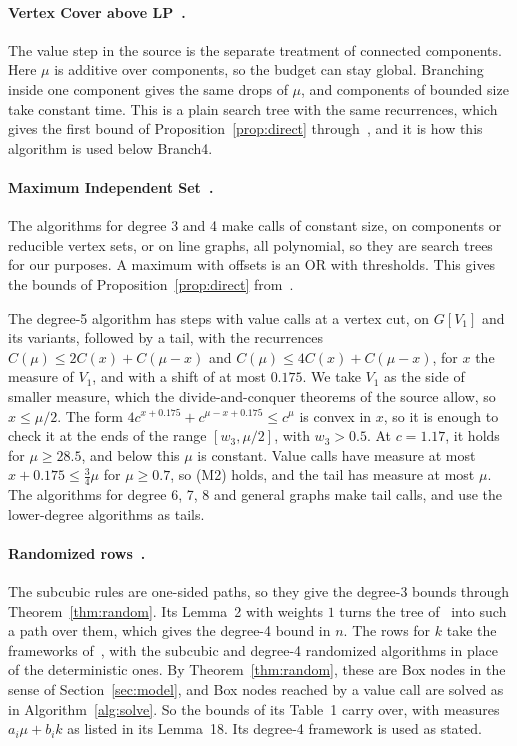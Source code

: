 \documentclass[11pt]{article}
\theoremstyle{definition}
\theoremstyle{remark}
\begin{document}
\paragraph{Vertex Cover above LP~\cite{LNRRS14}.} The value step in the source is the separate treatment of connected components. Here $\mu$ is additive over components, so the budget can stay global. Branching inside one component gives the same drops of $\mu$, and components of bounded size take constant time. This is a plain search tree with the same recurrences, which gives the first bound of Proposition~\ref{prop:direct} through~\cite{Mon18}, and it is how this algorithm is used below Branch4.

\paragraph{Maximum Independent Set~\cite{XN13,XN17b,XN16,XN17}.} The algorithms for degree 3 and 4 make calls of constant size, on components or reducible vertex sets, or on line graphs, all polynomial, so they are search trees for our purposes. A maximum with offsets is an OR with thresholds. This gives the bounds of Proposition~\ref{prop:direct} from~\cite{XN13,XN17b}.

The degree-5 algorithm has steps with value calls at a vertex cut, on $G[V_1]$ and its variants, followed by a tail, with the recurrences $C(\mu)\le2C(x)+C(\mu-x)$ and $C(\mu)\le4C(x)+C(\mu-x)$, for $x$ the measure of $V_1$, and with a shift of at most $0.175$. We take $V_1$ as the side of smaller measure, which the divide-and-conquer theorems of the source allow, so $x\le\mu/2$. The form $4c^{x+0.175}+c^{\mu-x+0.175}\le c^\mu$ is convex in $x$, so it is enough to check it at the ends of the range $[w_3,\mu/2]$, with $w_3>0.5$. At $c=1.17$, it holds for $\mu\ge28.5$, and below this $\mu$ is constant. Value calls have measure at most $x+0.175\le\frac34\mu$ for $\mu\ge0.7$, so (M2) holds, and the tail has measure at most $\mu$. The algorithms for degree 6, 7, 8 and general graphs make tail calls, and use the lower-degree algorithms as tails.

\paragraph{Randomized rows~\cite{CGHMZ25}.} The subcubic rules are one-sided paths, so they give the degree-3 bounds through Theorem~\ref{thm:random}. Its Lemma~2 with weights $1$ turns the tree of~\cite{XN17b} into such a path over them, which gives the degree-4 bound in $n$. The rows for $k$ take the frameworks of~\cite{XN17b,HN24}, with the subcubic and degree-4 randomized algorithms in place of the deterministic ones. By Theorem~\ref{thm:random}, these are Box nodes in the sense of Section~\ref{sec:model}, and Box nodes reached by a value call are solved as in Algorithm~\ref{alg:solve}. So the bounds of its Table~1 carry over, with measures $a_i\mu+b_ik$ as listed in its Lemma~18. Its degree-4 framework is used as stated.
\end{document}
